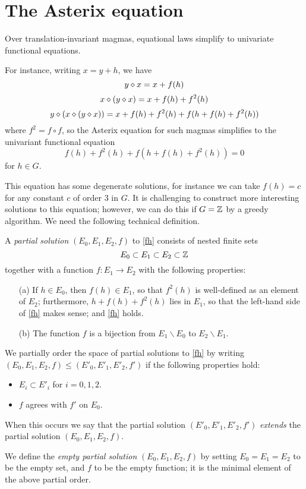 \section{The Asterix equation}\label{asterix-section}

Over translation-invariant magmas, equational laws simplify to univariate functional equations.

For instance, writing $x = y+h$, we have
$$ y \diamond x = x + f(h)$$
$$ x \diamond (y \diamond x) = x + f(h) + f^2(h)$$
$$ y \diamond (x \diamond (y \diamond x)) = x + f(h) + f^2(h) + f( h + f(h) + f^2(h) )$$
where $f^2 = f \circ f$, so the Asterix equation for such magmas simplifies to the univariant functional equation
\begin{equation}\label{fh}
   f(h) + f^2(h) + f( h + f(h) + f^2(h) ) = 0
\end{equation}
for $h \in G$.

This equation has some degenerate solutions, for instance we can take $f(h) = c$ for any constant $c$ of order $3$ in $G$.  It is challenging to construct more interesting solutions to this equation; however, we can do this if $G=\mathbb{Z}$ by a greedy algorithm.  We need the following technical definition.

\begin{definition}\label{partial-solution}  A \emph{partial solution} $(E_0, E_1, E_2, f)$ to \eqref{fh} consists of nested finite sets
$$ E_0 \subset E_1 \subset E_2 \subset \mathbb{Z}$$ together with a function $f: E_1 \to E_2$ with the following properties:
\begin{itemize}
  \item[(a)] If $h \in E_0$, then $f(h) \in E_1$, so that $f^2(h)$ is well-defined as an element of $E_2$; furthermore, $h + f(h) + f^2(h)$ lies in $E_1$, so that the left-hand side of \eqref{fh} makes sense; and \eqref{fh} holds.
  \item[(b)] The function $f$ is a bijection from $E_1 \backslash E_0$ to $E_2 \backslash E_1$.
\end{itemize}

We partially order the space of partial solutions to \eqref{fh} by writing $(E_0, E_1, E_2, f) \leq (E'_0, E'_1, E'_2, f')$ if the following properties hold:
\begin{itemize}
  \item $E_i \subset E'_i$ for $i=0,1,2$.
  \item $f$ agrees with $f'$ on $E_0$.
\end{itemize}
When this occurs we say that the partial solution $(E'_0, E'_1, E'_2, f')$ \emph{extends} the partial solution $(E_0, E_1, E_2, f)$.

We define the \emph{empty partial solution} $(E_0,E_1,E_2,f)$ by setting $E_0=E_1=E_2$ to be the empty set, and $f$ to be the empty function; it is the minimal element of the above partial order.
\end{definition}


